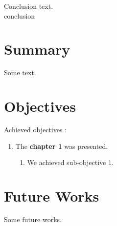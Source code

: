 \begin{chaptercover}{Conclusion}%
{
{\large {} text. \newline \\}}%
{conclusion}


\section{Summary}
Some text.


\section{Objectives}
Achieved objectives :
\begin{enumerate}[itemsep=0.1cm,topsep=0.1cm]
  \item The \textbf{chapter 1} was presented.
  \begin{enumerate}[label=\Alph* --,align=left,itemsep=.05cm,topsep=0.1cm]
    \item We achieved sub-objective 1.
  \end{enumerate}
\end{enumerate}


\section{Future Works} \label{sec:future-works}
Some future works.


\end{chaptercover}
